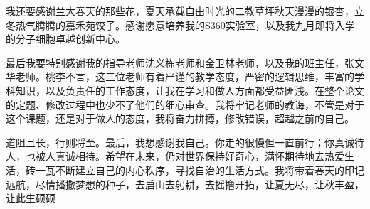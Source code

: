 \documentclass[AutoFakeBold]{LZUThesis}
\begin{document}
我还要感谢兰大春天的那些花，夏天承载自由时光的二教草坪秋天漫漫的银杏，立冬热气腾腾的嘉禾苑饺子。感谢愿意培养我的S360实验室，以及我九月即将入学的分子细胞卓越创新中心。

最后我要特别感谢我的指导老师沈义栋老师和金卫林老师，以及我的班主任，张文华老师。桃李不言，这三位老师有着严谨的教学态度，严密的逻辑思维，丰富的学科知识，以及负责任的工作态度，让我在学习和做人方面都受益匪浅。在整个论文的定题、修改过程中也少不了他们的细心审查。我将牢记老师的教诲，不管是对于这个课题，还是对于做人的态度，我将奋力拼搏，修改错误，超越之前的自己。

道阻且长，行则将至。最后，我想感谢我自己。你走的很慢但一直前行；你真诚待人，也被人真诚相待。希望在未来，仍对世界保持好奇心，满怀期待地去热爱生活，砖一瓦不断建立自己的内心秩序，寻找自治的生活方式。我将带着春天的印记远航，尽情播撒梦想的种子，去启山去躬耕，去摇撸开拓，让夏无尽，让秋丰盈，让此生硕硕

\Grade
\end{document}

